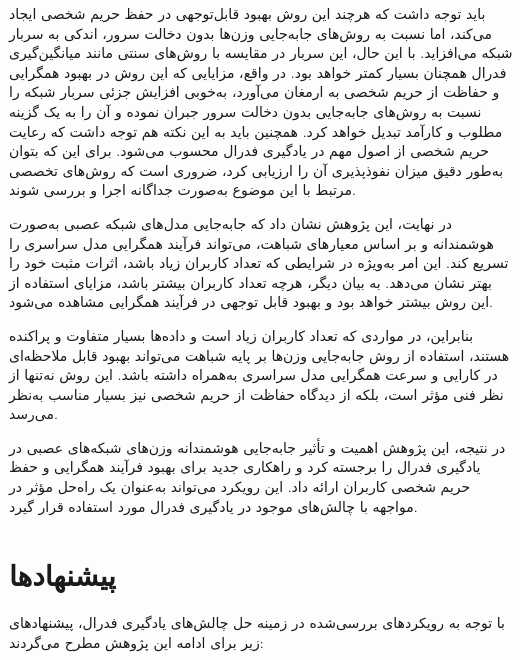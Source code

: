 باید توجه داشت که هرچند این روش بهبود قابل‌توجهی در حفظ حریم شخصی ایجاد می‌کند، اما نسبت به روش‌های جابه‌جایی وزن‌ها بدون دخالت سرور، اندکی به سربار شبکه می‌افزاید. با این حال، این سربار در مقایسه با روش‌های سنتی مانند میانگین‌گیری فدرال همچنان بسیار کمتر خواهد بود. در واقع، مزایایی که این روش در بهبود همگرایی و حفاظت از حریم شخصی به ارمغان می‌آورد، به‌خوبی افزایش جزئی سربار شبکه را نسبت به روش‌های جابه‌جایی بدون دخالت سرور جبران نموده و آن را به یک گزینه مطلوب و کارآمد تبدیل خواهد کرد.
همچنین باید به این نکته هم توجه داشت که رعایت حریم شخصی از اصول مهم در یادگیری فدرال محسوب می‌شود. برای این که بتوان به‌طور دقیق میزان نفوذپذیری آن را ارزیابی کرد، ضروری است که روش‌های تخصصی مرتبط با این موضوع به‌صورت جداگانه اجرا و بررسی شوند.

در نهایت، این پژوهش نشان داد که جابه‌جایی مدل‌های شبکه عصبی به‌صورت هوشمندانه و بر اساس معیارهای شباهت، می‌تواند فرآیند همگرایی مدل سراسری را تسریع کند. این امر به‌ویژه در شرایطی که تعداد کاربران زیاد باشد، اثرات مثبت خود را بهتر نشان می‌دهد. به بیان دیگر، هرچه تعداد کاربران بیشتر باشد، مزایای استفاده از این روش بیشتر خواهد بود و بهبود قابل توجهی در فرآیند همگرایی مشاهده می‌شود.

بنابراین، در مواردی که تعداد کاربران زیاد است و داده‌ها بسیار متفاوت و پراکنده هستند، استفاده از روش‌ جابه‌جایی وزن‌ها بر پایه شباهت می‌تواند بهبود قابل ملاحظه‌ای در کارایی و سرعت همگرایی مدل سراسری به‌همراه داشته باشد. این روش نه‌تنها از نظر فنی مؤثر است، بلکه از دیدگاه حفاظت از حریم شخصی نیز بسیار مناسب به‌نظر می‌رسد.

در نتیجه، این پژوهش اهمیت و تأثیر جابه‌جایی هوشمندانه وزن‌های شبکه‌های عصبی در یادگیری فدرال را برجسته کرد و راهکاری جدید برای بهبود فرآیند همگرایی و حفظ حریم شخصی کاربران ارائه داد. این رویکرد می‌تواند به‌عنوان یک راه‌حل مؤثر در مواجهه با چالش‌های موجود در یادگیری فدرال مورد استفاده قرار گیرد.



\section{پیشنهادها}
با توجه به رویکردهای بررسی‌شده در زمینه حل چالش‌های یادگیری فدرال، پیشنهادهای زیر برای ادامه این پژوهش مطرح می‌گردند:

